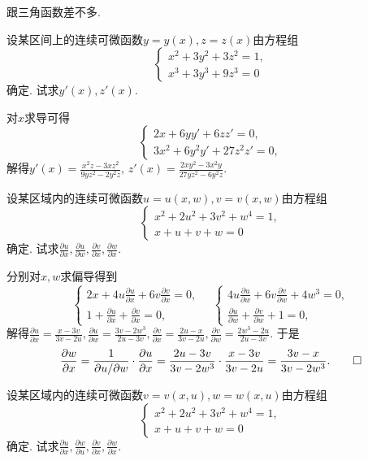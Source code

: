 \begin{quiza}
\begin{solution}
跟三角函数差不多.
\end{solution}
\woe 设某区间上的连续可微函数\(y=y(x),z=z(x)\)由方程组\[\begin{cases}
     x^2+3y^2+3z^2=1,\\ x^3+3y^3+9z^3=0
 \end{cases}\]确定. 试求\(y'(x), z'(x)\).
\begin{solution}
对\(x\)求导可得\[\begin{cases}
2x+6yy'+6zz'=0,\\3x^2+6y^2y'+27z^2z'=0,
\end{cases}\]解得\(y'(x)=\frac{x^2z-3xz^2}{9yz^2-2y^2z},\,z'(x)=\frac{2xy^2-3x^2y}{27yz^2-6y^2z}\).
\end{solution}
\woe 设某区域内的连续可微函数\(u=u(x,w),v=v(x,w)\)由方程组\[\begin{cases}
    x^2+2u^2+3v^2+w^4=1,\\x+u+v+w=0
\end{cases}\]确定. 试求\(\frac{\partial u}{\partial x},\frac{\partial u}{\partial w},\frac{\partial v}{\partial x},\frac{\partial w}{\partial x}.\)
\begin{solution}
分别对\(x,w\)求偏导得到\[\begin{cases}
2x+4u\frac{\partial u}{\partial x}+6v\frac{\partial v}{\partial x}=0,\\
1+\frac{\partial u}{\partial x}+\frac{\partial v}{\partial x}=0,
\end{cases}\quad\begin{cases}
4u\frac{\partial u}{\partial w}+6v\frac{\partial v}{\partial w}+4w^3=0,\\
\frac{\partial u}{\partial w}+\frac{\partial v}{\partial w}+1=0,
\end{cases}\]解得\(\frac{\partial u}{\partial x}=\frac{x-3v}{3v-2u},\frac{\partial u}{\partial w}=\frac{3v-2w^3}{2u-3v},\frac{\partial v}{\partial x}=\frac{2u-x}{3v-2u},\frac{\partial v}{\partial w}=\frac{2w^3-2u}{2u-3v}\). 于是\[\frac{\partial w}{\partial x}=\frac{1}{\partial u/\partial w}\cdot\frac{\partial u}{\partial x}=\frac{2u-3v}{3v-2w^3}\cdot\frac{x-3v}{3v-2u}=\frac{3v-x}{3v-2w^3}.\qedhere\]
\end{solution}
\woe 设某区域内的连续可微函数\(v=v(x,u),w=w(x,u)\)由方程组\[\begin{cases}
    x^2+2u^2+3v^2+w^4=1,\\x+u+v+w=0
\end{cases}\]确定. 试求\(\frac{\partial u}{\partial x},\frac{\partial w}{\partial u},\frac{\partial v}{\partial x},\frac{\partial w}{\partial x}.\)

\end{quiza}
